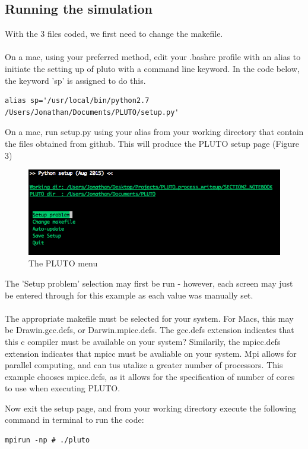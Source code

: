 \documentclass[12pt,a4paper]{report}
\begin{document}
\subsection{Running the simulation}
With the 3 files coded, we first need to change the makefile. \\
\\
On a mac, using your preferred method, edit your .bashrc profile with an alias to initiate the setting up of pluto with a command line keyword. In the code below, the keyword 'sp' is assigned to do this.
\begin{lstlisting}
alias sp='/usr/local/bin/python2.7 /Users/Jonathan/Documents/PLUTO/setup.py'
\end{lstlisting}
On a mac, run setup.py using your alias from your working directory that contain the files obtained from github. This will produce the PLUTO setup page (Figure 3)
\begin{figure}[h]
	\includegraphics[width=\textwidth]{pluto_menu_pic.png}
	\caption{The PLUTO menu}
\end{figure}
	
The 'Setup problem' selection may first be run - however, each screen may just be entered through for this example as each value was manually set.\\
\\
The appropriate makefile must be selected for your system. For Macs, this may be Drawin.gcc.defs, or Darwin.mpicc.defs. The gcc.defs extension indicates that this c compiler must be available on your system? Similarily, the mpicc.defs extension indicates that mpicc must be avaliable on your system. Mpi allows for parallel computing, and can tus utalize a greater number of processors. This example chooses mpicc.defs, as it allows for the specification of number of cores to use when executing PLUTO.

Now exit the setup page, and from your working directory execute the following command in terminal to run the code:
\begin{lstlisting}
mpirun -np # ./pluto
\end{lstlisting}
\end{document}
